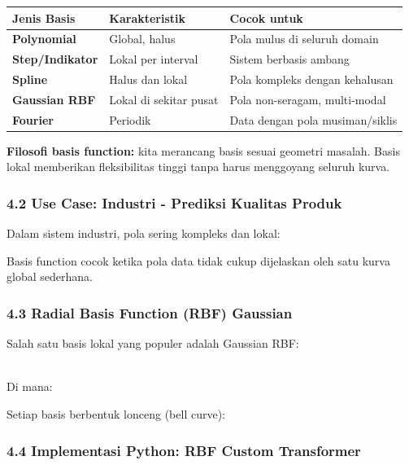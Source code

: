 \documentclass[12pt,a4paper]{article}
\begin{document}
\begin{tabular}{|l|l|l|}
\hline
Jenis Basis & Karakteristik & Cocok untuk \\
\hline
\textbf{Polynomial} & Global, halus & Pola mulus di seluruh domain \\
\hline
\textbf{Step/Indikator} & Lokal per interval & Sistem berbasis ambang \\
\hline
\textbf{Spline} & Halus dan lokal & Pola kompleks dengan kehalusan \\
\hline
\textbf{Gaussian RBF} & Lokal di sekitar pusat & Pola non-seragam, multi-modal \\
\hline
\textbf{Fourier} & Periodik & Data dengan pola musiman/siklis \\
\hline
\end{tabular}


\textbf{Filosofi basis function:} kita merancang basis sesuai geometri masalah. Basis lokal memberikan fleksibilitas tinggi tanpa harus menggoyang seluruh kurva.


\subsubsection{4.2 Use Case: Industri - Prediksi Kualitas Produk}

Dalam sistem industri, pola sering kompleks dan lokal:


Basis function cocok ketika pola data tidak cukup dijelaskan oleh satu kurva global sederhana.


\subsubsection{4.3 Radial Basis Function (RBF) Gaussian}

Salah satu basis lokal yang populer adalah Gaussian RBF:


\\[
h_j(x) = \exp\left(-\gamma (x - c_j)^2\right)
\\]


Di mana:


Setiap basis berbentuk lonceng (bell curve):


\subsubsection{4.4 Implementasi Python: RBF Custom Transformer}
\end{document}
